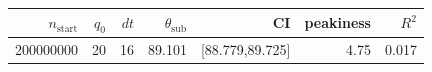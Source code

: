 \begin{tabular}{r r r r r r r}
\hline
$n_{\mathrm{start}}$ & $q_0$ & $dt$ & $\theta_{\mathrm{sub}}$ & CI & peakiness & $R^2$ \\
\hline
200000000 & 20 & 16 & 89.101 & [88.779,89.725] & 4.75 & 0.017 \\
\hline
\end{tabular}
